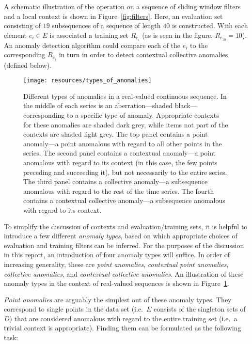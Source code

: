 A schematic illustration of the operation on a sequence of sliding window filters and a local context is shown in Figure~\ref{fig:filters}. Here, an evaluation set consisting of $19$ subsequences of a sequence of length $40$ is constructed. With each element $e_i \in E$ is associated a training set $R_{e_i}$ (as is seen in the figure, $R_{e_{10}} = 10$). An anomaly detection algorithm could compare each of the $e_i$ to the corresponding $R_{e_i}$ in turn in order to detect contextual collective anomalies (defined below).

\begin{figure}[htb]
    \begin{center}
        \texttt{[image: resources/types\_of\_anomalies]}
    \end{center}
    \caption{{\small Different types of anomalies in a real-valued continuous sequence. In the middle of each series is an aberration---shaded black---corresponding to a specific type of anomaly. Appropriate contexts for these anomalies are shaded dark grey, while items not part of the contexts are shaded light grey. The top panel contains a point anomaly---a point anomalous with regard to all other points in the series. The second panel contains a contextual anomaly---a point anomalous with regard to its context (in this case, the few points preceding and succeeding it), but not necessarily to the entire series. The third panel contains a collective anomaly---a subsequence anomalous with regard to the rest of the time series. The fourth contains a contextual collective anomaly---a subsequence anomalous with regard to its context.}}
\label{fig:anomaly_types}
\end{figure}

To simplify the discussion of contexts and evaluation/training sets, it is helpful to introduce a few different \emph{anomaly types}, based on which appropriate choices of evaluation and training filters can be inferred. For the purposes of the discussion in this report, an introduction of four anomaly types will suffice. In order of increasing generality, these are \emph{point anomalies}, \emph{contextual point anomalies}, \emph{collective anomalies}, and \emph{contextual collective anomalies}. An illustration of these anomaly types in the context of real-valued sequences is shown in Figure~\ref{fig:anomaly_types}.

\emph{Point anomalies} are arguably the simplest out of these anomaly types. They correspond to single points in the data set (i.e.\ $E$ consists of the singleton sets of $D$) that are considered anomalous with regard to the entire training set (i.e.\ a trivial context is appropriate). Finding them can be formulated as the following task:

